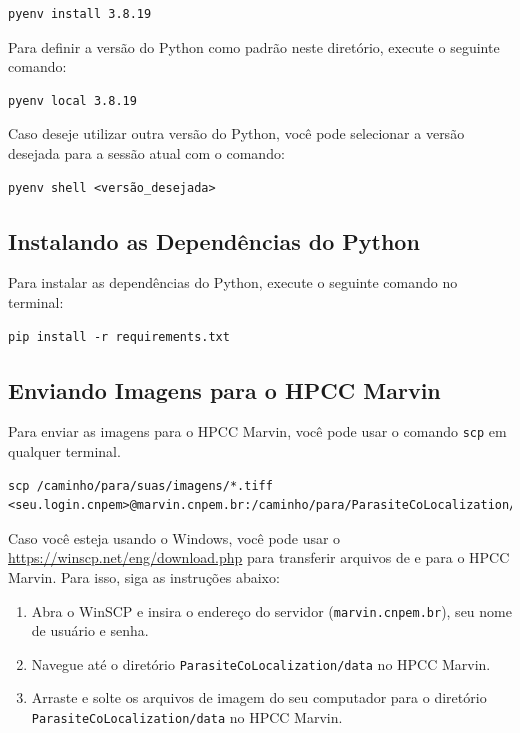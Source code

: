 \documentclass{article}
\begin{document}
\begin{verbatim}
pyenv install 3.8.19
\end{verbatim}

Para definir a versão do Python como padrão neste diretório, execute o seguinte comando:

\begin{verbatim}
pyenv local 3.8.19
\end{verbatim}

Caso deseje utilizar outra versão do Python, você pode selecionar a versão desejada para a sessão atual com o comando:

\begin{verbatim}
pyenv shell <versão_desejada>
\end{verbatim}

\subsection{Instalando as Dependências do Python}

Para instalar as dependências do Python, execute o seguinte comando no terminal:

\begin{verbatim}
pip install -r requirements.txt
\end{verbatim}

\subsection{Enviando Imagens para o HPCC Marvin}

Para enviar as imagens para o HPCC Marvin, você pode usar o comando \texttt{scp} em qualquer terminal.

\begin{verbatim}
scp /caminho/para/suas/imagens/*.tiff <seu.login.cnpem>@marvin.cnpem.br:/caminho/para/ParasiteCoLocalization/data
\end{verbatim}

Caso você esteja usando o Windows, você pode usar o \href{WinSCP}{https://winscp.net/eng/download.php} para transferir arquivos de e para o HPCC Marvin. Para isso, siga as instruções abaixo:

\begin{enumerate}
  \item Abra o WinSCP e insira o endereço do servidor (\texttt{marvin.cnpem.br}), seu nome de usuário e senha.
  \item Navegue até o diretório \texttt{ParasiteCoLocalization/data} no HPCC Marvin.
  \item Arraste e solte os arquivos de imagem do seu computador para o diretório \texttt{ParasiteCoLocalization/data} no HPCC Marvin.
\end{enumerate}
\end{document}
